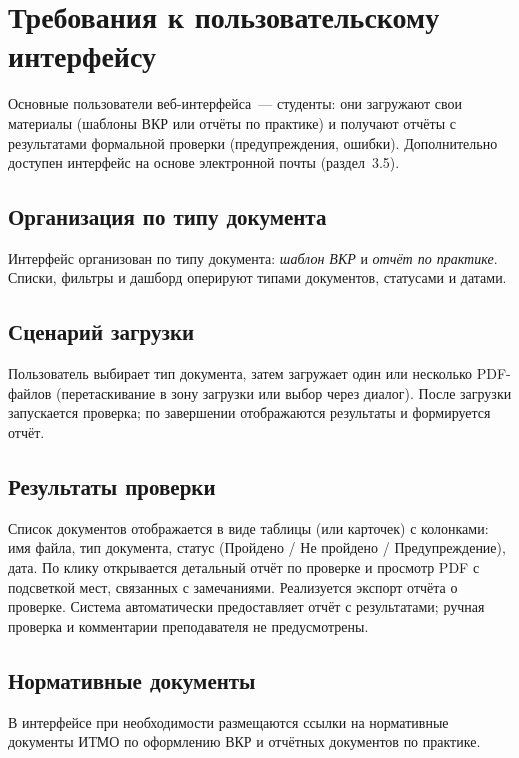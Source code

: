 \section{Требования к пользовательскому интерфейсу}

Основные пользователи веб-интерфейса~--- студенты: они загружают свои материалы (шаблоны ВКР или отчёты по практике) и получают отчёты с результатами формальной проверки (предупреждения, ошибки). Дополнительно доступен интерфейс на основе электронной почты (раздел~3.5).

\subsection{Организация по типу документа}

Интерфейс организован по типу документа: \emph{шаблон ВКР} и \emph{отчёт по практике}. Списки, фильтры и дашборд оперируют типами документов, статусами и датами.

\subsection{Сценарий загрузки}

Пользователь выбирает тип документа, затем загружает один или несколько PDF-файлов (перетаскивание в зону загрузки или выбор через диалог). После загрузки запускается проверка; по завершении отображаются результаты и формируется отчёт.

\subsection{Результаты проверки}

Список документов отображается в виде таблицы (или карточек) с колонками: имя файла, тип документа, статус (Пройдено / Не пройдено / Предупреждение), дата. По клику открывается детальный отчёт по проверке и просмотр PDF с подсветкой мест, связанных с замечаниями. Реализуется экспорт отчёта о проверке. Система автоматически предоставляет отчёт с результатами; ручная проверка и комментарии преподавателя не предусмотрены.

\subsection{Нормативные документы}

В интерфейсе при необходимости размещаются ссылки на нормативные документы ИТМО по оформлению ВКР и отчётных документов по практике.
